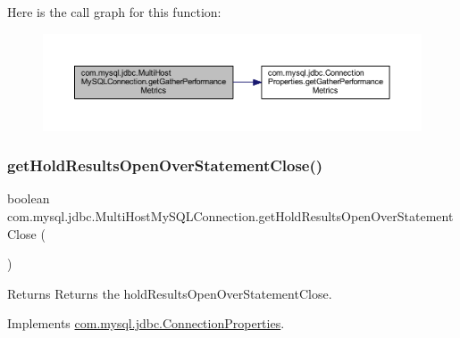 Here is the call graph for this function\+:
\nopagebreak
\begin{figure}[H]
\begin{center}
\leavevmode
\includegraphics[width=350pt]{classcom_1_1mysql_1_1jdbc_1_1_multi_host_my_s_q_l_connection_a5e3312dbc7d1e713c67aa90d1d7527be_cgraph}
\end{center}
\end{figure}
\mbox{\label{classcom_1_1mysql_1_1jdbc_1_1_multi_host_my_s_q_l_connection_a7dd4373e730d9de2a0a47b5670e157ef}} 
\subsubsection{\texorpdfstring{get\+Hold\+Results\+Open\+Over\+Statement\+Close()}{getHoldResultsOpenOverStatementClose()}}
{\footnotesize\ttfamily boolean com.\+mysql.\+jdbc.\+Multi\+Host\+My\+S\+Q\+L\+Connection.\+get\+Hold\+Results\+Open\+Over\+Statement\+Close (\begin{DoxyParamCaption}{ }\end{DoxyParamCaption})}

\begin{DoxyReturn}{Returns}
Returns the hold\+Results\+Open\+Over\+Statement\+Close. 
\end{DoxyReturn}


Implements \mbox{\hyperlink{interfacecom_1_1mysql_1_1jdbc_1_1_connection_properties_a33f1647a0e97bcb10d880500fc9e8cf0}{com.\+mysql.\+jdbc.\+Connection\+Properties}}.

